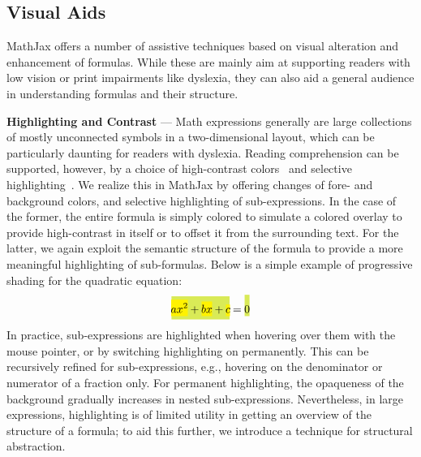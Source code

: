 \documentclass{sig-alternate}
\begin{document}
\def\myparagraph#1{\vspace{1ex}\noindent\textbf{#1} ---}

\subsection{Visual Aids}

MathJax offers a number of assistive techniques based on visual alteration
and enhancement of formulas. While these are mainly aim at supporting
readers with low vision or print impairments like dyslexia, they can also
aid a general audience in understanding formulas and their structure.

\myparagraph{Highlighting and Contrast} Math expressions generally are large
collections of mostly unconnected symbols in a two-dimensional layout, which can
be particularly daunting for readers with dyslexia.  Reading comprehension can
be supported, however, by a choice of high-contrast
colors~\cite{rello2012optimal} and selective
highlighting~\cite{jones2008strategies}. We realize this in MathJax by offering
changes of fore- and background colors, and selective highlighting of
sub-expressions. In the case of the former, the entire
formula is simply colored to simulate a colored overlay to provide high-contrast
in itself or to offset it from the surrounding text.  For the latter, we again
exploit the semantic structure of the formula to provide a more meaningful
highlighting of sub-formulas. Below is a simple example of progressive shading
for the quadratic equation:
\def\cb#1{\colorbox{yellow}{\ensuremath{\!\!\displaystyle#1\!\!}}}
\def\cc#1{\colorbox{GreenYellow}{\ensuremath{\!\!\displaystyle#1\!\!}}}
\[\cc{\cb{ax^2} + \cb{bx} + \cb{c}} = \cc{\rule[3ex]{0pt}{0pt}0}\]
In practice, sub-expressions are highlighted when hovering over them with the
mouse pointer, or by switching highlighting on permanently. This can be
recursively refined for sub-expressions, e.g., hovering on the denominator or
numerator of a fraction only. For permanent highlighting, the opaqueness of the
background gradually increases in nested sub-expressions. Nevertheless, in large
expressions, highlighting is of limited utility in getting an overview of the structure
of a formula; to aid this further, we introduce a technique for
structural abstraction.
\end{document}
